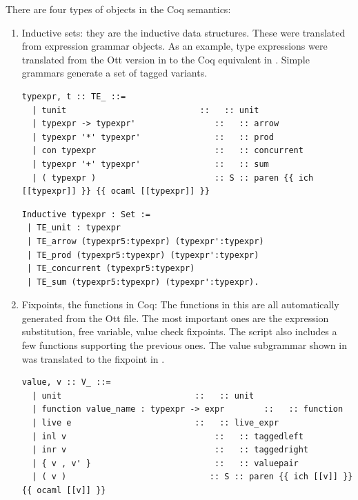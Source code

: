 \documentclass[12pt,twoside,notitlepage]{report}
\theoremstyle{plain}%
\theoremstyle{definition}
\theoremstyle{remark}
\begin{document}
There are four types of objects in the Coq semantics:
\begin{enumerate}
\item{Inductive sets: they are the inductive data structures. These were translated from expression grammar objects. As an example, type expressions were translated from the Ott version in  to the Coq equivalent in . Simple grammars generate a set of tagged variants. 

\begin{lstlisting}[language={Ott}, caption={Ott type expressions}, label={lst:otttypexpr}]
typexpr, t :: TE_ ::=
  | tunit                           ::   :: unit
  | typexpr -> typexpr'                ::   :: arrow
  | typexpr '*' typexpr'               ::   :: prod
  | con typexpr                        ::   :: concurrent
  | typexpr '+' typexpr'               ::   :: sum
  | ( typexpr )                        :: S :: paren {{ ich [[typexpr]] }} {{ ocaml [[typexpr]] }}
\end{lstlisting}


\begin{minipage}{\linewidth}

\begin{lstlisting}[language={Coq},caption={Coq type expr}, label={lst:coqtypexpr}]
Inductive typexpr : Set := 
 | TE_unit : typexpr
 | TE_arrow (typexpr5:typexpr) (typexpr':typexpr)
 | TE_prod (typexpr5:typexpr) (typexpr':typexpr)
 | TE_concurrent (typexpr5:typexpr)
 | TE_sum (typexpr5:typexpr) (typexpr':typexpr).
\end{lstlisting}

\end{minipage}
}
\item{Fixpoints, the functions in Coq: The functions in this are all automatically generated from the Ott file. The most important ones are the expression substitution, free variable, value check fixpoints. The script also includes a few functions supporting the previous ones. The value subgrammar shown in  was translated to the fixpoint in . 

\begin{minipage}{\linewidth}
\begin{lstlisting}[language={Ott}, caption={Ott value subgrammar}, label={lst:ottvaluesub}]
value, v :: V_ ::=
  | unit                           ::   :: unit
  | function value_name : typexpr -> expr        ::   :: function
  | live e                         ::   :: live_expr
  | inl v                              ::   :: taggedleft
  | inr v                              ::   :: taggedright
  | { v , v' }                         ::   :: valuepair
  | ( v )                             :: S :: paren {{ ich [[v]] }} {{ ocaml [[v]] }}
\end{lstlisting}
\end{minipage}


}
\end{enumerate}
\end{document}
